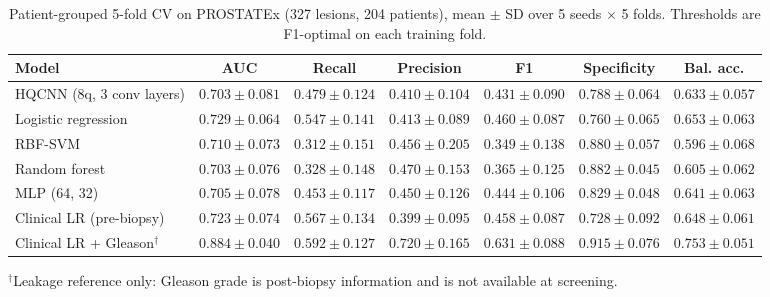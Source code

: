 \begin{table}[t]
\centering
\caption{Patient-grouped 5-fold CV on PROSTATEx (327 lesions, 204 patients), mean $\pm$ SD over 5 seeds $\times$ 5 folds. Thresholds are F1-optimal on each training fold.}
\label{tab:v3_cv}
\small
\begin{tabular}{lcccccc}
\toprule
Model & AUC & Recall & Precision & F1 & Specificity & Bal. acc. \\
\midrule
HQCNN (8q, 3 conv layers) & $0.703 \pm 0.081$ & $0.479 \pm 0.124$ & $0.410 \pm 0.104$ & $0.431 \pm 0.090$ & $0.788 \pm 0.064$ & $0.633 \pm 0.057$ \\
Logistic regression & $0.729 \pm 0.064$ & $0.547 \pm 0.141$ & $0.413 \pm 0.089$ & $0.460 \pm 0.087$ & $0.760 \pm 0.065$ & $0.653 \pm 0.063$ \\
RBF-SVM & $0.710 \pm 0.073$ & $0.312 \pm 0.151$ & $0.456 \pm 0.205$ & $0.349 \pm 0.138$ & $0.880 \pm 0.057$ & $0.596 \pm 0.068$ \\
Random forest & $0.703 \pm 0.076$ & $0.328 \pm 0.148$ & $0.470 \pm 0.153$ & $0.365 \pm 0.125$ & $0.882 \pm 0.045$ & $0.605 \pm 0.062$ \\
MLP (64, 32) & $0.705 \pm 0.078$ & $0.453 \pm 0.117$ & $0.450 \pm 0.126$ & $0.444 \pm 0.106$ & $0.829 \pm 0.048$ & $0.641 \pm 0.063$ \\
Clinical LR (pre-biopsy) & $0.723 \pm 0.074$ & $0.567 \pm 0.134$ & $0.399 \pm 0.095$ & $0.458 \pm 0.087$ & $0.728 \pm 0.092$ & $0.648 \pm 0.061$ \\
Clinical LR + Gleason$^{\dagger}$ & $0.884 \pm 0.040$ & $0.592 \pm 0.127$ & $0.720 \pm 0.165$ & $0.631 \pm 0.088$ & $0.915 \pm 0.076$ & $0.753 \pm 0.051$ \\
\bottomrule
\end{tabular}
\par\smallskip\footnotesize $^{\dagger}$Leakage reference only: Gleason grade is post-biopsy information and is not available at screening.
\end{table}
